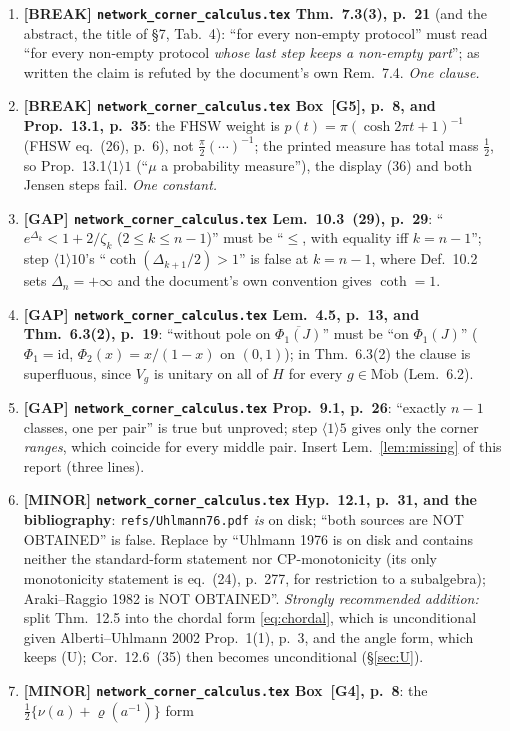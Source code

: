 \documentclass[11pt]{article}
\newcommand{\Mob}{\operatorname{M\ddot ob}}
\newcommand{\id}{\mathrm{id}}
\newcommand{\doc}{\texttt{network\_corner\_calculus.tex}}
\theoremstyle{definition}\newtheorem{example}[theorem]{Example}
\begin{document}
\begin{enumerate}[leftmargin=2.2em]
\item \textbf{[BREAK] \doc{} Thm.~7.3(3), p.~21} (and the abstract, the title of \S7,
 Tab.~4): ``for every non-empty protocol'' must read ``for every non-empty protocol
 \emph{whose last step keeps a non-empty part}''; as written the claim is refuted by the
 document's own Rem.~7.4.  \emph{One clause.}
\item \textbf{[BREAK] \doc{} Box~[G5], p.~8, and Prop.~13.1, p.~35}: the FHSW weight is
 $p(t)=\pi(\cosh2\pi t+1)^{-1}$ (FHSW eq.~(26), p.~6), not $\frac\pi2(\cdots)^{-1}$; the
 printed measure has total mass $\frac12$, so Prop.~13.1$\langle1\rangle1$ (``$\mu$ a
 probability measure''), the display (36) and both Jensen steps fail.  \emph{One constant.}
\item \textbf{[GAP] \doc{} Lem.~10.3~(29), p.~29}: ``$e^{\Delta_k}<1+2/\zeta_k$
 ($2\le k\le n-1$)'' must be ``$\le$, with equality iff $k=n-1$''; step
 $\langle1\rangle10$'s ``$\coth(\Delta_{k+1}/2)>1$'' is false at $k=n-1$, where
 Def.~10.2 sets $\Delta_n=+\infty$ and the document's own convention gives $\coth=1$.
\item \textbf{[GAP] \doc{} Lem.~4.5, p.~13, and Thm.~6.3(2), p.~19}: ``without pole on
 $\overline{\Phi_1(J)}$'' must be ``on $\Phi_1(J)$'' ($\Phi_1=\id$, $\Phi_2(x)=x/(1-x)$ on
 $(0,1)$); in Thm.~6.3(2) the clause is superfluous, since $V_g$ is unitary on all of $H$
 for every $g\in\Mob$ (Lem.~6.2).
\item \textbf{[GAP] \doc{} Prop.~9.1, p.~26}: ``exactly $n-1$ classes, one per pair'' is
 true but unproved; step $\langle1\rangle5$ gives only the corner \emph{ranges}, which
 coincide for every middle pair.  Insert Lem.~\ref{lem:missing} of this report (three
 lines).
\item \textbf{[MINOR] \doc{} Hyp.~12.1, p.~31, and the bibliography}:
 \texttt{refs/Uhlmann76.pdf} \emph{is} on disk; ``both sources are NOT OBTAINED'' is
 false.  Replace by ``Uhlmann 1976 is on disk and contains neither the standard-form
 statement nor CP-monotonicity (its only monotonicity statement is eq.~(24), p.~277, for
 restriction to a subalgebra); Araki--Raggio 1982 is NOT OBTAINED''.  \emph{Strongly
 recommended addition:} split Thm.~12.5 into the chordal form \eqref{eq:chordal}, which
 is unconditional given Alberti--Uhlmann 2002 Prop.~1(1), p.~3, and the angle form, which
 keeps (U); Cor.~12.6~(35) then becomes unconditional (\S\ref{sec:U}).
\item \textbf{[MINOR] \doc{} Box~[G4], p.~8}: the $\frac12\{\nu(a)+\varrho(a^{-1})\}$ form

\end{enumerate}
\end{document}
